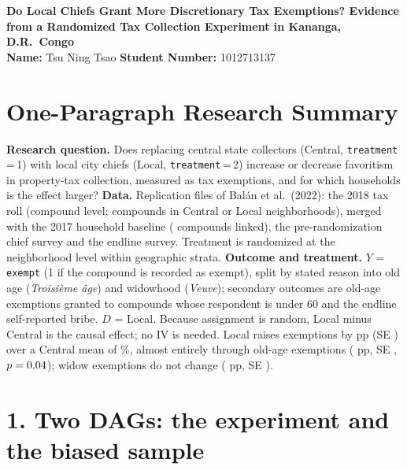 \documentclass[11pt]{article}
\begin{document}
\begin{center}
{\large\bfseries Do Local Chiefs Grant More Discretionary Tax Exemptions? Evidence from a Randomized Tax Collection Experiment in Kananga, D.R.\ Congo}\\[6pt]
\textbf{Name:} Tsu Ning Tsao \qquad \textbf{Student Number:} 1012713137
\end{center}

\section*{One-Paragraph Research Summary}
\textbf{Research question.} Does replacing central state collectors (Central, \texttt{treatment}\,=\,1) with local city chiefs (Local, \texttt{treatment}\,=\,2) increase or decrease favoritism in property-tax collection, measured as tax exemptions, and for which households is the effect larger? \textbf{Data.} Replication files of Bal\'an et al.\ (2022): the 2018 tax roll (compound level; \Nall{} compounds in \Nnb{} Central or Local neighborhoods), merged with the 2017 household baseline (\Nlinked{} compounds linked), the pre-randomization chief survey and the endline survey. Treatment is randomized at the neighborhood level within geographic strata. \textbf{Outcome and treatment.} $Y$ = \texttt{exempt} (1 if the compound is recorded as exempt), split by stated reason into old age (\emph{Troisi\`eme \^age}) and widowhood (\emph{Veuve}); secondary outcomes are old-age exemptions granted to compounds whose respondent is under 60 and the endline self-reported bribe. $D$ = Local. Because assignment is random, Local minus Central is the causal effect; no IV is needed. Local raises exemptions by \Eexempt{} pp (SE \SEexempt) over a Central mean of \Mexempt\%, almost entirely through old-age exemptions (\Eold{} pp, SE \SEold, $p=0.04$); widow exemptions do not change (\Ewid{} pp, SE \SEwid).

\section*{1. Two DAGs: the experiment and the biased sample}
\end{document}
